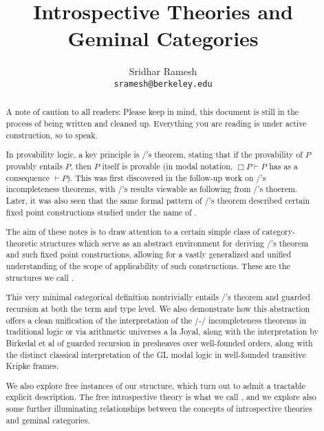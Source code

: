 \documentclass[12pt]{article}
\title{Introspective Theories and Geminal Categories}
\author{
  Sridhar Ramesh\\
  \texttt{sramesh@berkeley.edu}
}
\begin{document}
\maketitle

\begin{abstract}
{\color{red} A note of caution to all readers: Please keep in mind, this document is still in the process of being written and cleaned up. Everything you are reading is under active construction, so to speak.}

In provability logic, a key principle is \Loeb/'s theorem, stating that if the provability of $P$ provably entails $P$, then $P$ itself is provable (in modal notation, $\Box P \vdash P$ has as a consequence $\vdash P$). This was first discovered in the follow-up work on \Goedel/'s incompleteness theorems, with \Goedel/'s results viewable as following from \Loeb/'s thoerem. Later, it was also seen that the same formal pattern of \Loeb/'s theorem described certain fixed point constructions studied under the name of .

The aim of these notes is to draw attention to a certain simple class of category-theoretic structures which serve as an abstract environment for deriving \Loeb/'s theorem and such fixed point constructions, allowing for a vastly generalized and unified understanding of the scope of applicability of such constructions. These are the structures we call .

This very minimal categorical definition nontrivially entails \Loeb/'s theorem and guarded recursion at both the term and type level. We also demonstrate how this abstraction offers a clean unification of the interpretation of the \Godel/-\Lob/ incompleteness theorems in traditional logic or via arithmetic universes a la Joyal, along with the interpretation by Birkedal et al of guarded recursion in presheaves over well-founded orders, along with the distinct classical interpretation of the GL modal logic in well-founded transitive Kripke frames.

We also explore free instances of our structure, which turn out to admit a tractable explicit description. The free introspective theory is what we call , and we explore also some further illuminating relationships between the concepts of introspective theories and geminal categories.

\end{abstract}
\end{document}
